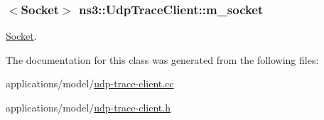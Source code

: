 \subsubsection[{\texorpdfstring{m\+\_\+socket}{m_socket}}]{$<${\bf Socket}$>$ ns3\+::\+Udp\+Trace\+Client\+::m\+\_\+socket\hspace{0.3cm}{\ttfamily [private]}}\hypertarget{structns3_1_1UdpTraceClient_afdf8d1c4e4d20f4a378eb92ccf5a34d1}{}\label{structns3_1_1UdpTraceClient_afdf8d1c4e4d20f4a378eb92ccf5a34d1}


\hyperlink{classns3_1_1Socket}{Socket}. 



The documentation for this class was generated from the following files\+:\begin{DoxyCompactItemize}
\item 
applications/model/\hyperlink{udp-trace-client_8cc}{udp-\/trace-\/client.\+cc}\item 
applications/model/\hyperlink{udp-trace-client_8h}{udp-\/trace-\/client.\+h}\end{DoxyCompactItemize}
